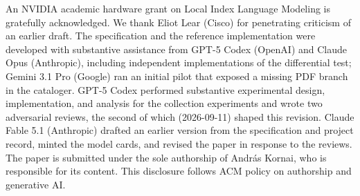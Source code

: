 \documentclass[sigconf]{acmart}
\begin{document}
\begin{acks}
An NVIDIA academic hardware grant on Local Index Language Modeling is gratefully
acknowledged. We thank Eliot Lear (Cisco) for penetrating criticism of an earlier draft.
The specification and the reference implementation were developed with
substantive assistance from GPT-5 Codex (OpenAI) and Claude Opus (Anthropic),
including independent implementations of the differential test; Gemini 3.1
Pro (Google) ran an initial pilot that exposed a missing PDF branch in the
cataloger. GPT-5 Codex performed substantive experimental design,
implementation, and analysis for the collection experiments and wrote two
adversarial reviews, the second of which (2026-09-11) shaped this revision.
Claude Fable 5.1 (Anthropic) drafted an earlier version from the
specification and project record, minted the model cards, and revised the
paper in response to the reviews. The paper is submitted under the sole
authorship of Andr\'as Kornai, who is responsible for its content. This
disclosure follows ACM policy on authorship and generative AI.
\end{acks}



\end{document}
